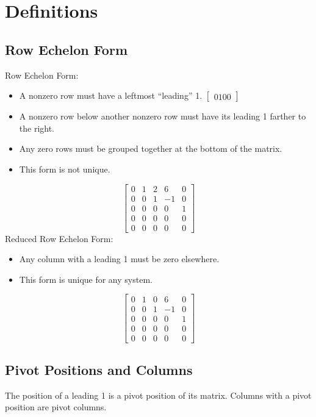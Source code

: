\documentclass[12pt]{article}
\begin{document}
\section{Definitions}


\subsection{Row Echelon Form}

Row Echelon Form:
\begin{itemize}
    \item A nonzero row must have a leftmost ``leading'' 1. $\begin{bmatrix}0 1 0 0\end{bmatrix}$
    \item A nonzero row below another nonzero row must have its leading 1 farther to the right.
    \item Any zero rows must be grouped together at the bottom of the matrix.
    \item This form is not unique.
\end{itemize}
$$
\begin{bmatrix}
    0 & 1 & 2 & 6 & 0\\
    0 & 0 & 1 & -1 & 0\\
    0 & 0 & 0 & 0 & 1\\
    0 & 0 & 0 & 0 & 0\\
    0 & 0 & 0 & 0 & 0
\end{bmatrix}
$$
Reduced Row Echelon Form:
\begin{itemize}
    \item Any column with a leading 1 must be zero elsewhere.
    \item This form is unique for any system.
\end{itemize}
$$
\begin{bmatrix}
    0 & 1 & 0 & 6 & 0\\
    0 & 0 & 1 & -1 & 0\\
    0 & 0 & 0 & 0 & 1\\
    0 & 0 & 0 & 0 & 0\\
    0 & 0 & 0 & 0 & 0
\end{bmatrix}
$$


\subsection{Pivot Positions and Columns}

The position of a leading 1 is a pivot position of its matrix. Columns with a pivot position are pivot columns.
\end{document}
